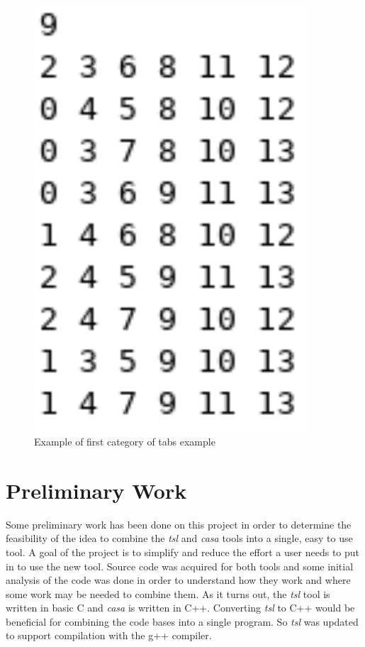 \documentclass[a4full,12pt]{article}
\begin{document}

\begin{figure}[htb]
\centering
\includegraphics[width=4in,keepaspectratio]{images/casa_output.png}
\caption{Example of first category of tabs example}
\label{fig:casa_output}
\end{figure}

\section{Preliminary Work}
Some preliminary work has been done on this project in order to determine the
  feasibility of the idea to combine the \emph{tsl} and \emph{casa} tools into 
  a single, easy to use tool. A goal of the project is to simplify and reduce the
  effort a user needs to put in to use the new tool. Source code was acquired for
  both tools and some initial analysis of the code was done in order to understand
  how they work and where some work may be needed to combine them. As it
  turns out, the \emph{tsl} tool is written in basic C and \emph{casa} is written
  in C++. Converting \emph{tsl} to C++ would be beneficial for combining the 
  code bases into a single program. So \emph{tsl} was updated to support compilation
  with the g++ compiler.
\end{document}
